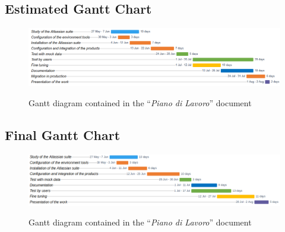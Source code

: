 \begin{landscape}
	\vspace*{\fill}
	\section{Estimated Gantt Chart}
	\label{gantt_1}
	\begin{figure}[H]
		\centering
		\includegraphics[width=22cm]{resources/work_plan_gantt}\\
		\caption{Gantt diagram contained in the ``\textit{Piano di Lavoro}'' document}
	\end{figure}
	\vspace*{\fill}
\end{landscape}
\newpage
\begin{landscape}
	\vspace*{\fill}
	\section{Final Gantt Chart}
	\label{gantt_2}
	\begin{figure}[H]
		\centering
		\includegraphics[width=22cm]{resources/revised_gantt}\\
		\caption{Gantt diagram contained in the ``\textit{Piano di Lavoro}'' document}
	\end{figure}
	\vspace*{\fill}
\end{landscape}